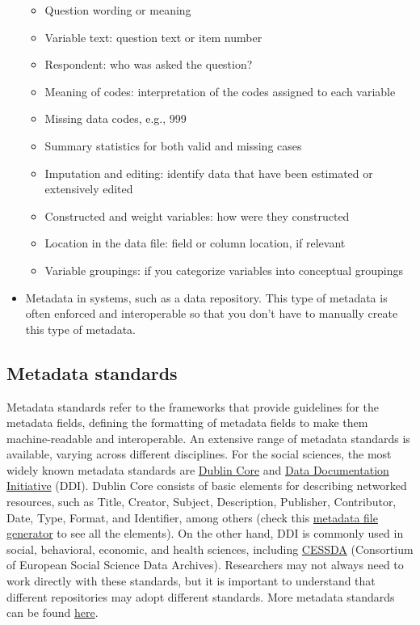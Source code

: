 \documentclass[
  letterpaper,
  DIV=11,
  numbers=noendperiod]{scrreprt}
\begin{document}
\begin{itemize}
  \begin{itemize}
  \item
    Question wording or meaning
  \item
    Variable text: question text or item number
  \item
    Respondent: who was asked the question?
  \item
    Meaning of codes: interpretation of the codes assigned to each
    variable
  \item
    Missing data codes, e.g., 999
  \item
    Summary statistics for both valid and missing cases
  \item
    Imputation and editing: identify data that have been estimated or
    extensively edited
  \item
    Constructed and weight variables: how were they constructed
  \item
    Location in the data file: field or column location, if relevant
  \item
    Variable groupings: if you categorize variables into conceptual
    groupings
  \end{itemize}
\item
  Metadata in systems, such as a data repository. This type of metadata
  is often enforced and interoperable so that you don't have to manually
  create this type of metadata.
\end{itemize}

\hypertarget{metadata-standards}{%
\subsection*{\texorpdfstring{\textbf{Metadata
standards}}{Metadata standards}}\label{metadata-standards}}

Metadata standards refer to the frameworks that provide guidelines for
the metadata fields, defining the formatting of metadata fields to make
them machine-readable and interoperable. An extensive range of metadata
standards is available, varying across different disciplines. For the
social sciences, the most widely known metadata standards are
\href{https://www.dublincore.org/}{Dublin Core} and
\href{https://ddialliance.org/}{Data Documentation Initiative} (DDI).
Dublin Core consists of basic elements for describing networked
resources, such as Title, Creator, Subject, Description, Publisher,
Contributor, Date, Type, Format, and Identifier, among others (check
this
\href{https://nsteffel.github.io/dublin_core_generator/generator_nq.html}{metadata
file generator} to see all the elements). On the other hand, DDI is
commonly used in social, behavioral, economic, and health sciences,
including \href{https://www.cessda.eu/}{CESSDA} (Consortium of European
Social Science Data Archives). Researchers may not always need to work
directly with these standards, but it is important to understand that
different repositories may adopt different standards. More metadata
standards can be found
\href{https://zenodo.org/record/3543756\#.ZAkCnuxUmrO}{here}.
\end{document}
